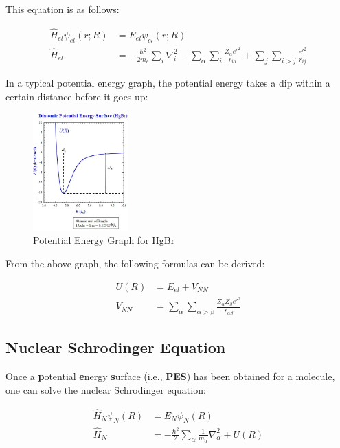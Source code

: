 \documentclass[
  letterpaper,
  DIV=11,
  numbers=noendperiod]{scrreprt}
\begin{document}
This equation is as follows:

\begin{align}
  \hat{H}_{el}\psi_{el}(r; R) &=  E_{el}\psi_{el}(r; R) \\ 
  \hat{H}_{el} &= -\frac{\hbar^2}{2m_e}\sum_i\nabla_i^2 - \sum_\alpha\sum_i\frac{Z_\alpha e'^2}{r_{i\alpha}} + \sum_j\sum_{i > j}\frac{e'^2}{r_{ij}}
\end{align}

In a typical potential energy graph, the potential energy takes a dip
within a certain distance before it goes up:

\begin{figure}

{\centering \includegraphics[width=1.44in,height=\textheight]{./images/wk2a/hgbr.jpg}

}

\caption{Potential Energy Graph for HgBr}

\end{figure}

From the above graph, the following formulas can be derived:

\begin{align}
  U(R) &= E_{el} + V_{NN} \\ 
  V_{NN} &= \sum_\alpha \sum_{\alpha > \beta}\frac{Z_\alpha Z_\beta e'^2}{r_{\alpha\beta}}
\end{align}

\hypertarget{nuclear-schrodinger-equation}{%
\subsection{Nuclear Schrodinger
Equation}\label{nuclear-schrodinger-equation}}

Once a \textbf{p}otential \textbf{e}nergy \textbf{s}urface (i.e.,
\textbf{PES}) has been obtained for a molecule, one can solve the
nuclear Schrodinger equation:

\begin{align}
  \hat{H}_N\psi_N(R) &= E_N\psi_N(R) \\ 
  \hat{H}_N &= -\frac{\hbar^2}{2}\sum_\alpha\frac{1}{m_\alpha}\nabla_\alpha^2 + U(R)
\end{align}
\end{document}
